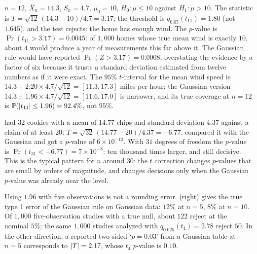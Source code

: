 \begin{worked}
$n = 12$, $\bar{X}_n = 14.3$, $S_n = 4.7$, $\mu_0 = 10$, $H_0: \mu \leq 10$ against $H_1: \mu > 10$.
The statistic is $T = \sqrt{12}\,(14.3 - 10)/4.7 = 3.17$, the threshold is $q_{0.05}(t_{11}) = 1.80$ (not $1.645$), and the test rejects: the home has enough wind.
The $p$-value is $\Pr(t_{11} > 3.17) = 0.0045$: of $1{,}000$ homes whose true mean wind is exactly $10$, about $4$ would produce a year of measurements this far above it.
The Gaussian rule would have reported $\Pr(Z > 3.17) = 0.0008$, overstating the evidence by a factor of six because it trusts a standard deviation estimated from twelve numbers as if it were exact.
The $95\%$ $t$-interval for the mean wind speed is $14.3 \pm 2.20 \times 4.7/\sqrt{12} = [11.3, 17.3]$ miles per hour; the Gaussian version $14.3 \pm 1.96 \times 4.7/\sqrt{12} = [11.6, 17.0]$ is narrower, and its true coverage at $n = 12$ is $\mathbb{P}(\lvert t_{11}\rvert \leq 1.96) = 92.4\%$, not $95\%$.
\end{worked}

\begin{worked}
 had $32$ cookies with a mean of $14.77$ chips and standard deviation $4.37$ against a claim of at least $20$: $T = \sqrt{32}\,(14.77 - 20)/4.37 = -6.77$.
 compared it with the Gaussian and got a $p$-value of $6 \times 10^{-12}$.
With $31$ degrees of freedom the $p$-value is $\Pr(t_{31} < -6.77) = 7 \times 10^{-8}$: ten thousand times larger, and still decisive.
This is the typical pattern for $n$ around $30$: the $t$ correction changes $p$-values that are small by orders of magnitude, and changes decisions only when the Gaussian $p$-value was already near the level.
\end{worked}

\begin{pitfall}
Using $1.96$ with five observations is not a rounding error.
 (right) gives the true type 1 error of the Gaussian rule on Gaussian data: $12\%$ at $n = 5$, $8\%$ at $n = 10$.
Of $1{,}000$ five-observation studies with a true null, about $122$ reject at the nominal $5\%$; the same $1{,}000$ studies analyzed with $q_{0.025}(t_4) = 2.78$ reject $50$.
In the other direction, a reported two-sided `$p = 0.03$' from a Gaussian table at $n = 5$ corresponds to $\lvert T\rvert = 2.17$, whose $t_4$ $p$-value is $0.10$.
\end{pitfall}

